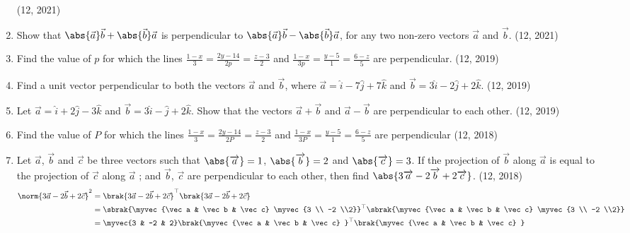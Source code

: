 \begin{enumerate}[label=\thesubsection.\arabic*, ref=\thesubsection.\theenumi]
		\hfill (12, 2021)
%	
	\item Show that $\abs{\vec{a}} \vec{b} + \abs{\vec{b}} \vec{a}$ is perpendicular to $\abs{\vec{a}} \vec{b} - \abs{\vec{b}} \vec{a}$, for any two non-zero vectors $\vec{a}$ and $\vec{b}$. \hfill (12, 2021)
	\item Find the value of $p$ for which the lines 
	$\frac{1-x}{3} = \frac{2y-14}{2p} = \frac{z-3}{2}$ and $\frac{1-x}{3p} = \frac{y-5}{1} = \frac{6-z}{5}$
		are perpendicular.
 \hfill (12, 2019)
%	
	\item Find a unit vector perpendicular to both the vectors $\overrightarrow{a}$ and $\overrightarrow{b}$, where $\overrightarrow{a} = \hat{i} - 7\hat{j} + 7\hat{k}$ and $\overrightarrow{b} = 3\hat{i} - 2\hat{j} + 2\hat{k}$. \hfill (12, 2019)
	\item Let $\overrightarrow{a} = \hat{i} + 2\hat{j} - 3\hat{k}$ and $\overrightarrow{b} = 3\hat{i} - \hat{j} + 2\hat{k}$. Show that the vectors $\overrightarrow{a} + \overrightarrow{b}$ and $\overrightarrow{a} - \overrightarrow{b}$ are perpendicular to each other. \hfill (12, 2019)
\item Find the value of $P$ for which the lines 
$\frac{1 - x}{3} = \frac{2y - 14}{2P} = \frac{z - 3}{2}$
and
$\frac{1 - x}{3P} = \frac{y - 5}{1} = \frac{6 - z}{5}$
are perpendicular
\hfill (12, 2018)
 \item Let $\overrightarrow{a}$, $\overrightarrow{b} $ and $\overrightarrow{c}$ be three vectors such that $\abs{\overrightarrow{a}}=1$, $\abs {\overrightarrow{b}}=2 $ and $\abs{\overrightarrow{c}}=3$. If the projection of $\overrightarrow{b}$ along $\overrightarrow{a}$ is equal to the projection of $\overrightarrow{c}$ along $\overrightarrow{a}$ ; and $\overrightarrow{b}$, $\overrightarrow{c}$ are perpendicular to each other, then find $\abs{3\overrightarrow{a}- 2\overrightarrow{b} +2\overrightarrow{c}}$.
\hfill (12, 2018)
    \\
    \solution 
\begin{align}
	\norm{3\vec a-2\vec b+2\vec c}^2
&= 
\brak{3\vec a-2\vec b+2\vec c}^{\top}
	\brak{3\vec a-2\vec b+2\vec c}
	\\
&= 
\sbrak{\myvec{\vec a & \vec b & \vec c}
\myvec{3 \\ -2 \\2}}^{\top}
\sbrak{\myvec{\vec a & \vec b & \vec c}
\myvec{3 \\ -2 \\2}}
\\
&= 
	\myvec{3 & -2 & 2}\brak{\myvec{\vec a & \vec b & \vec c}
}^{\top}
\brak{\myvec{\vec a & \vec b & \vec c}
}
\end{align}
\end{enumerate}
